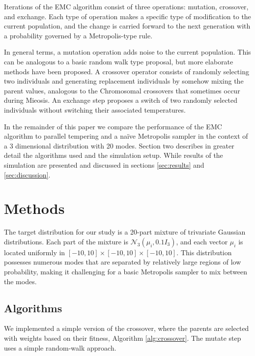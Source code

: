\documentclass[12pt]{article}\usepackage[]{graphicx}\usepackage[]{color}
\begin{document}
Iterations of the EMC algorithm consist of three operations: mutation,
crossover, and exchange. Each type of operation makes a specific type
of modification to the current population, and the change is carried
forward to the next generation with a probability governed by a
Metropolis-type rule.

In general terms, a mutation operation adds noise to the current
population. This can be analogous to a basic random walk type
proposal, but more elaborate methods have been
proposed. A crossover operator consists of
randomly selecting two individuals and generating replacement
individuals by somehow mixing the parent values, analogous to the
Chromosomal crossovers that sometimes occur during Mieosis.  An
exchange step proposes a switch of two randomly selected individuals
without switching their associated temperatures.


In the remainder of this paper we compare the performance of the EMC
algorithm to parallel tempering and a na\"ive Metropolis sampler in
the context of a 3 dimensional distribution with 20 modes.  Section
two describes in greater detail the algorithms used and the simulation
setup.  While results of the simulation are presented and discussed in
sections \ref{sec:results} and \ref{sec:discussion}.

\setcounter{section}{1}
\section{Methods}
\label{sec:methods}
The target distribution for our study is a 20-part mixture of
trivariate Gaussian distributions. Each part of the mixture is
$\mathcal{N}_3(\mu_i, 0.1I_3)$, and each vector $\mu_i$ is located
uniformly in $[-10,10]\times[-10,10]\times[-10,10].$ This distribution
possesses numerous modes that are separated by relatively large
regions of low probability, making it challenging for a basic
Metropolis sampler to mix between the modes.

\subsection{Algorithms}
\label{sec:algorithms}

We implemented a simple version of the crossover, where the parents
are selected with weights based on their fitness, Algorithm
\ref{alg:crossover}. The mutate step uses a simple random-walk
approach.
\end{document}
